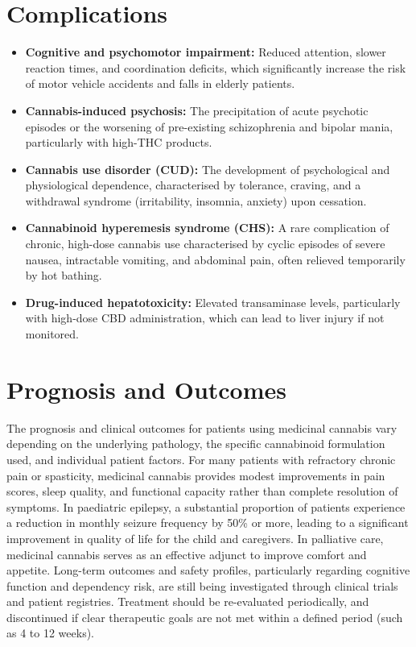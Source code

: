 \section*{Complications}
\begin{itemize}
    \item \textbf{Cognitive and psychomotor impairment:} Reduced attention, slower reaction times, and coordination deficits, which significantly increase the risk of motor vehicle accidents and falls in elderly patients.
    \item \textbf{Cannabis-induced psychosis:} The precipitation of acute psychotic episodes or the worsening of pre-existing schizophrenia and bipolar mania, particularly with high-THC products.
    \item \textbf{Cannabis use disorder (CUD):} The development of psychological and physiological dependence, characterised by tolerance, craving, and a withdrawal syndrome (irritability, insomnia, anxiety) upon cessation.
    \item \textbf{Cannabinoid hyperemesis syndrome (CHS):} A rare complication of chronic, high-dose cannabis use characterised by cyclic episodes of severe nausea, intractable vomiting, and abdominal pain, often relieved temporarily by hot bathing.
    \item \textbf{Drug-induced hepatotoxicity:} Elevated transaminase levels, particularly with high-dose CBD administration, which can lead to liver injury if not monitored.
\end{itemize}

\section*{Prognosis and Outcomes}
The prognosis and clinical outcomes for patients using medicinal cannabis vary depending on the underlying pathology, the specific cannabinoid formulation used, and individual patient factors. For many patients with refractory chronic pain or spasticity, medicinal cannabis provides modest improvements in pain scores, sleep quality, and functional capacity rather than complete resolution of symptoms. In paediatric epilepsy, a substantial proportion of patients experience a reduction in monthly seizure frequency by 50\% or more, leading to a significant improvement in quality of life for the child and caregivers. In palliative care, medicinal cannabis serves as an effective adjunct to improve comfort and appetite. Long-term outcomes and safety profiles, particularly regarding cognitive function and dependency risk, are still being investigated through clinical trials and patient registries. Treatment should be re-evaluated periodically, and discontinued if clear therapeutic goals are not met within a defined period (such as 4 to 12 weeks).

